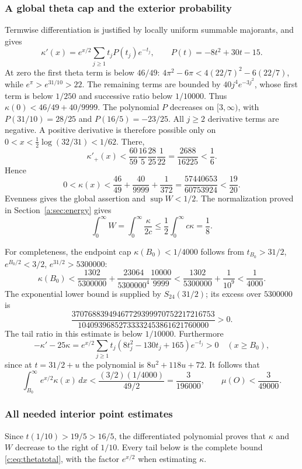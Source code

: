 \documentclass[11pt,a4paper]{article}
\numberwithin{equation}{section}
\theoremstyle{definition}\newtheorem{definition}[theorem]{Definition}
\theoremstyle{remark}\newtheorem{remark}[theorem]{Remark}
\begin{document}
\subsubsection{A global theta cap and the exterior probability}
Termwise differentiation is justified by locally uniform summable majorants, and gives
\[
 \kappa'(x)=e^{x/2}\sum_{j\ge1}t_jP(t_j)e^{-t_j},
 \qquad P(t)=-8t^2+30t-15.
\]
At zero the first theta term is below $46/49$:
$4\pi^2-6\pi<4(22/7)^2-6(22/7)$, while
$e^\pi>e^{31/10}>22$.
The remaining terms are bounded by $40j^4e^{-3j^2}$,
whose first term is below $1/250$ and successive ratio below $1/10000$.
Thus $\kappa(0)<46/49+40/9999$.
The polynomial $P$ decreases on $[3,\infty)$, with
$P(31/10)=28/25$ and $P(16/5)=-23/25$.
All $j\ge2$ derivative terms are negative.
A positive derivative is therefore possible only on
$0<x<\frac12\log(32/31)<1/62$.
There,
\[
 \kappa'_+(x)<\frac{60}{59}\frac{16}{5}\frac{28}{25}\frac1{22}
 =\frac{2688}{16225}<\frac16.
\]
Hence
\[
 0<\kappa(x)<\frac{46}{49}+\frac{40}{9999}+\frac1{372}
 =\frac{57440653}{60753924}<\frac{19}{20}.
\]
Evenness gives the global assertion and $\sup W<1/2$.
The normalization proved in Section~\ref{a:sec:energy} gives
\[
 \int_0^\infty W
 =\int_0^\infty\frac{\kappa}{2c}\le\frac12\int_0^\infty c\kappa=\frac18.
\]

For completeness, the endpoint cap $\kappa({B_0})<1/4000$ follows from
$t_{B_0}>31/2$, $e^{{B_0}/2}<3/2$, $e^{31/2}>5300000$:
\[
 \kappa({B_0})<\frac{1302}{5300000}
 +\frac{23064}{5300000^4}\frac{10000}{9999}
 <\frac{1302}{5300000}+\frac1{10^9}<\frac1{4000}.
\]
The exponential lower bound is supplied by $S_{24}(31/2)$;
its excess over $5300000$ is
\[
 \frac{37076883949467729399970752217216753}
 {10409396852733332453861621760000}>0.
\]
The tail ratio in this estimate is below $1/10000$.
Furthermore
\[
 -\kappa'-25\kappa
 =e^{x/2}\sum_{j\ge1}t_j(8t_j^2-130t_j+165)e^{-t_j}>0
 \quad(x\ge {B_0}),
\]
since at $t=31/2+u$ the polynomial is $8u^2+118u+72$.
It follows that
\[
 \int_{B_0}^\infty e^{x/2}\kappa(x)\,dx
 <\frac{(3/2)(1/4000)}{49/2}=\frac3{196000},
 \qquad \mu(O)<\frac3{49000}.
\]

\subsubsection{All needed interior point estimates}
Since $t(1/10)>19/5>16/5$, the differentiated polynomial proves that
$\kappa$ and $W$ decrease to the right of $1/10$.
Every tail below is the complete bound \eqref{c:eq:thetatotal}, with the factor $e^{x/2}$ when estimating $\kappa$.
\end{document}
